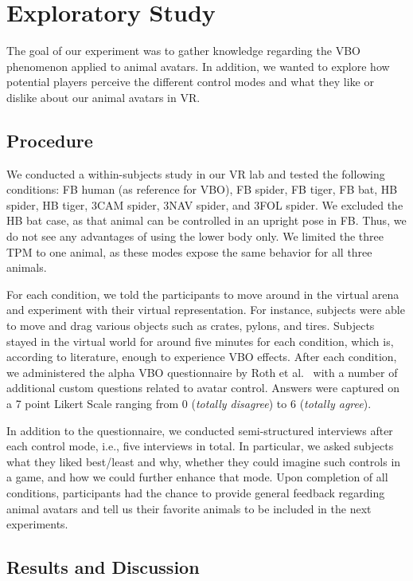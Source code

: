 \documentclass{sigchi-ext}
\begin{document}
\section{Exploratory Study}

The goal of our experiment was to gather knowledge regarding the VBO phenomenon applied to animal avatars. In addition, we wanted to explore how potential players perceive the different control modes and what they like or dislike about our animal avatars in VR.

\subsection{Procedure}
We conducted a within-subjects study in our VR lab and tested the following conditions: FB human (as reference for VBO), FB spider, FB tiger, FB bat, HB spider, HB tiger, 3CAM spider, 3NAV spider, and 3FOL spider. We excluded the HB bat case, as that animal can be controlled in an upright pose in FB. Thus, we do not see any advantages of using the lower body only. We limited the three TPM to one animal, as these modes expose the same behavior for all three animals.

For each condition, we told the participants to move around in the virtual arena and experiment with their virtual representation. For instance, subjects were able to move and drag various objects such as crates, pylons, and tires. Subjects stayed in the virtual world for around five minutes for each condition, which is, according to literature, enough to experience VBO effects. After each condition, we administered the alpha VBO questionnaire by Roth et al.~\cite{roth2017alpha} with a number of additional custom questions related to avatar control. Answers were captured on a 7 point Likert Scale ranging from 0 (\textit{totally disagree}) to 6 (\textit{totally agree}).

In addition to the questionnaire, we conducted semi-structured interviews after each control mode, i.e., five interviews in total. In particular, we asked subjects what they liked best/least and why, whether they could imagine such controls in a game, and how we could further enhance that mode. Upon completion of all conditions, participants had the chance to provide general feedback regarding animal avatars and tell us their favorite animals to be included in the next experiments.


\subsection{Results and Discussion}
\end{document}

